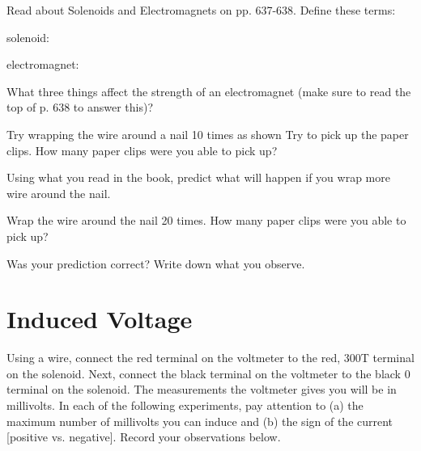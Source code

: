\documentclass[10pt]{exam}
\begin{document}
\begin{questions}
\question Read about Solenoids and Electromagnets on pp. 637-638.  Define these terms:

\vspace{2em}

solenoid: \vs

electromagnet: \vs 


\question What three things affect the strength of an electromagnet (make sure to read the top of p. 638 to answer this)? \vs 

\question Try wrapping the wire around a nail 10 times as shown Try to pick up the paper clips.  How many paper clips were you able to pick up?  

\vspace{4em}

\question Using what you read in the book, predict what will happen if you wrap more wire around the nail.

\vs 

\question Wrap the wire around the nail 20 times.  How many paper clips were you able to pick up? 

\vspace{4em}


\question Was your prediction correct? Write down what you observe.

\vs

\vspace{5em}


\end{questions}


\pagebreak 



\section{Induced Voltage}


Using a wire, connect the red terminal on the voltmeter to the red, 300T terminal on the solenoid. Next, connect the black terminal on the voltmeter to the black 0 terminal on the solenoid. The measurements the voltmeter gives you will be in millivolts.  In each of the following experiments, pay attention to (a) the maximum number of millivolts you can induce and (b) the sign of the current [positive vs. negative].  Record your observations below.
\end{document}
